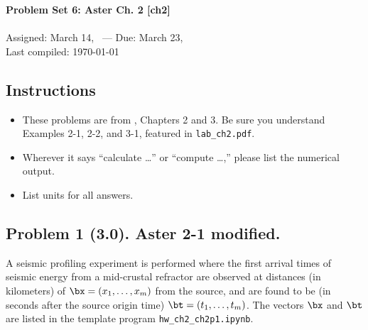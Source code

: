 \documentclass[11pt,titlepage,fleqn]{article}
\newcommand{\tfile}{{\tt hw\_ch2\_ch2p1.ipynb}}
\begin{document}

\begin{spacing}{1.2}
\centering
{\large \bf Problem Set 6: Aster Ch. 2 [ch2]} \\
\cltag\ \\
Assigned: March 14, \cyear\ --- Due: March 23, \cyear\ \\
Last compiled: \today
\end{spacing}


\subsection*{Instructions}

\begin{itemize}
\item These problems are from \citet{Aster}, Chapters 2 and 3. Be sure you understand Examples 2-1, 2-2, and 3-1, featured in \verb+lab_ch2.pdf+.
\item Wherever it says ``calculate \ldots'' or ``compute \ldots,'' please list the numerical output.
\item List units for all answers.
\end{itemize}

\subsection*{Problem 1 (3.0). Aster 2-1 modified.}

A seismic profiling experiment is performed where the first arrival times of seismic energy from a mid-crustal refractor are observed at distances (in kilometers) of $\bx = (x_1, \ldots, x_m)$ from the source, and are found to be (in seconds after the source origin time) $\bt = (t_1, \ldots, t_m)$. The vectors $\bx$ and $\bt$ are listed in the template program \tfile.
\end{document}
